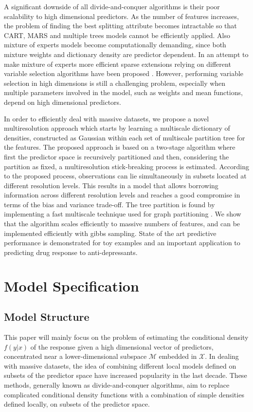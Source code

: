 \documentclass{article}
\begin{document}
A significant downside of all divide-and-conquer algorithms is their poor scalability to high dimensional predictors. As the number of features increases, the problem of finding the best splitting attribute becomes intractable so that CART, MARS and multiple trees models cannot be efficiently applied. Also mixture of experts models become computationally demanding, since both mixture weights and dictionary density are predictor dependent. In an attempt to make mixture of experts more efficient sparse extensions relying on different variable selection algorithms have been proposed \cite{SparseMoF}. However, performing variable selection in high dimensions is still a challenging problem, especially when multiple parameters involved in the model, such as weights and mean functions, depend on high dimensional predictors.

 In order to efficiently deal with massive datasets, we propose a novel multiresolution approach which starts by learning a multiscale dictionary of densities, constructed as Gaussian within each set of multiscale partition tree for the features. The proposed approach is based on a two-stage algorithm where first the predictor space is recursively partitioned and then, considering the partition as fixed, a multiresolution stick-breaking process is estimated. According to the proposed process, observations can lie simultaneously in subsets located at different resolution levels. This results in a model that allows borrowing information across different resolution levels and reaches a good compromise in terms of the bias and variance trade-off. The tree partition is found by implementing a fast multiscale technique used for graph partitioning \cite{metis}.  We show that the algorithm scales efficiently to massive numbers of features, and can be implemented efficiently with gibbs sampling.  State of the art predictive performance is demonstrated for toy examples and an important application to predicting drug response to anti-depressants.

 
 
\section{Model Specification}

\subsection{ Model Structure} %
This paper will mainly focus on the problem of estimating the conditional density $f(y|x)$ of the response given a high dimensional vector of predictors, concentrated near a lower-dimensional subspace $\mathcal{M}$ embedded in $\mathcal{X}$. In dealing with massive datasets, the idea of combining different local models defined on subsets of the predictor space have increased popularity in the last decade. These methods, generally known as divide-and-conquer algorithms, aim to replace complicated conditional density functions with a combination of simple densities defined locally, on subsets of the predictor space.
\end{document}
